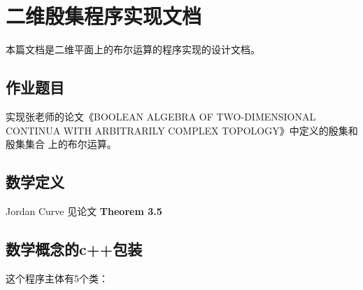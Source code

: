 \documentclass[a4paper]{book}
\makeatletter
\newcommand{\voidenvironment}[1]{%
  \expandafter\providecommand\csname env@#1@save@env\endcsname{}%
  \expandafter\providecommand\csname env@#1@process\endcsname{}%
  \@ifundefined{#1}{}{\RenewEnviron{#1}{}}%
}
\numberwithin{equation}{chapter}
\theoremstyle{definition}
\makeatother
\begin{document}
\pagestyle{empty}

\tableofcontents
\clearpage

\pagestyle{fancy}
\fancyhead{}
\rhead{\today}

\setcounter{chapter}{-1}




\chapter{二维殷集程序实现文档}
本篇文档是二维平面上的布尔运算的程序实现的设计文档。


\section{\heiti 作业题目}
实现张老师的论文《BOOLEAN ALGEBRA OF TWO-DIMENSIONAL CONTINUA
WITH ARBITRARILY COMPLEX TOPOLOGY》中定义的殷集和殷集集合
上的布尔运算。

\section{\heiti 数学定义}

\begin{numerate}
\end{numerate}


	Jordan Curve 见论文 \textbf{Theorem 3.5} 


\section{\heiti 数学概念的c++包装}

这个程序主体有5个类：
\end{document}
